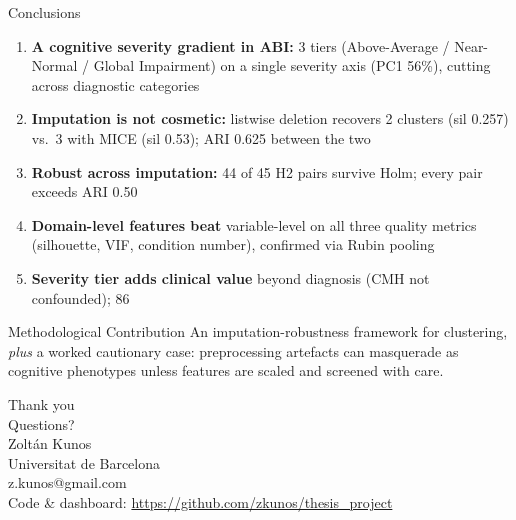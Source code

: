 \documentclass[aspectratio=169, 11pt]{beamer}
\begin{document}
\begin{frame}{Conclusions}
  \begin{enumerate}
    \item \textbf{A cognitive severity gradient in ABI:} 3 tiers (Above-Average / Near-Normal / Global Impairment) on a single severity axis (PC1 56\%), cutting across diagnostic categories
    \item \textbf{Imputation is not cosmetic:} listwise deletion recovers 2 clusters (sil 0.257) vs.\ 3 with MICE (sil 0.53); ARI 0.625 between the two
    \item \textbf{Robust across imputation:} 44 of 45 H2 pairs survive Holm; every pair exceeds ARI 0.50
    \item \textbf{Domain-level features beat} variable-level on all three quality metrics (silhouette, VIF, condition number), confirmed via Rubin pooling
    \item \textbf{Severity tier adds clinical value} beyond diagnosis (CMH not confounded); 86%
  \end{enumerate}

  \vspace{1em}
  \begin{block}{Methodological Contribution}
    An imputation-robustness framework for clustering, \emph{plus} a worked cautionary case: preprocessing artefacts can masquerade as cognitive phenotypes unless features are scaled and screened with care.
  \end{block}
\end{frame}

\begin{frame}[plain]
  \centering
  \vspace{2cm}
  {\LARGE\textcolor{ubblue}{Thank you}}\\[1.5em]
  {\large Questions?}\\[2em]
  \textcolor{ubgray}{Zolt\'an Kunos}\\
  \textcolor{ubgray}{Universitat de Barcelona}\\[0.8em]
  \textcolor{ubgray}{z.kunos@gmail.com}\\[1em]
  \small\textcolor{ubgray}{Code \& dashboard: \url{https://github.com/zkunos/thesis_project}}
\end{frame}
\end{document}
